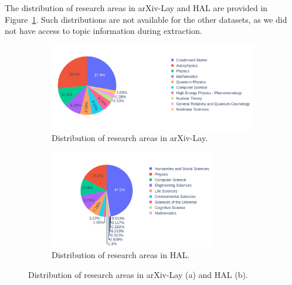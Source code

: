 The distribution of research areas in arXiv-Lay and HAL are provided in Figure~\ref{fig:research-areas}. Such distributions are not available for the other datasets, as we did not have access to topic information during extraction.



\begin{figure}
  \centering
  \small
    \begin{subfigure}[b]{\textwidth}
      \includegraphics[width=\textwidth]{images/chapter5/distribution_research_areas_arxiv.pdf}
      \caption{Distribution of research areas in arXiv-Lay.}
    \end{subfigure}
    \begin{subfigure}[b]{\textwidth}
      \includegraphics[width=0.8\textwidth]{images/chapter5/distribution_research_areas_hal.pdf}
      \caption{Distribution of research areas in HAL.}
    \end{subfigure}
  \caption{Distribution of research areas in arXiv-Lay (a) and HAL (b).}
  \label{fig:research-areas}
\end{figure}


